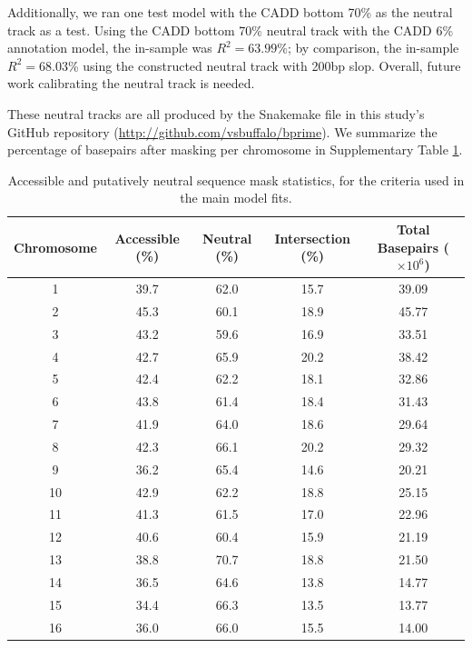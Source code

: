 \documentclass[11pt]{article}
\begin{document}
Additionally, we ran one test model with the CADD bottom 70\% as the neutral
track as a test. Using the CADD bottom 70\% neutral track with the CADD 6\%
annotation model, the in-sample was $R^2=63.99$\%; by comparison, the in-sample
$R^2=68.03$\% using the constructed neutral track with 200bp slop. Overall,
future work calibrating the neutral track is needed.

These neutral tracks are all produced by the Snakemake file
 in this study's GitHub repository
(\url{http://github.com/vsbuffalo/bprime}). We summarize the percentage of
basepairs after masking per chromosome in Supplementary Table
\ref{supp-table:masks}.

\begin{table}
    \label{supp-table:masks}
\centering
\caption{Accessible and putatively neutral sequence mask statistics, for the criteria used in 
         the main model fits.}
\begin{tabular}{|c|cccc|}
\hline
Chromosome & Accessible (\%) & Neutral (\%) & Intersection (\%) & Total Basepairs ($\times 10^6$) \\
\hline 
1 &        39.7 &     62.0 &  15.7 &     39.09 \\
2 &        45.3 &     60.1 &  18.9 &     45.77 \\
3 &        43.2 &     59.6 &  16.9 &     33.51 \\
4 &        42.7 &     65.9 &  20.2 &     38.42 \\
5 &        42.4 &     62.2 &  18.1 &     32.86 \\
6 &        43.8 &     61.4 &  18.4 &     31.43 \\
7 &        41.9 &     64.0 &  18.6 &     29.64 \\
8 &        42.3 &     66.1 &  20.2 &     29.32 \\
9 &        36.2 &     65.4 &  14.6 &     20.21 \\
10 &        42.9 &     62.2 &  18.8 &     25.15 \\
11 &        41.3 &     61.5 &  17.0 &     22.96 \\
12 &        40.6 &     60.4 &  15.9 &     21.19 \\
13 &        38.8 &     70.7 &  18.8 &     21.50 \\
14 &        36.5 &     64.6 &  13.8 &     14.77 \\
15 &        34.4 &     66.3 &  13.5 &     13.77 \\
16 &        36.0 &     66.0 &  15.5 &     14.00 \\

\end{tabular}
\end{table}
\end{document}
